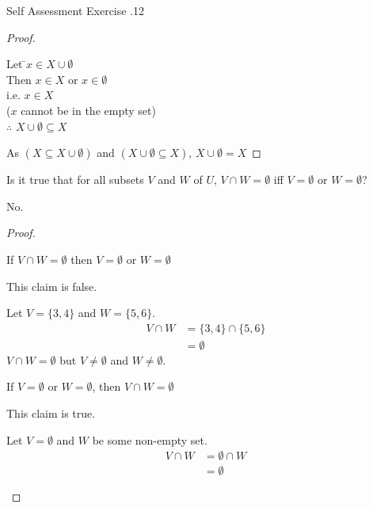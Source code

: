 \documentclass[\main/notes.tex]{subfiles}
\begin{document}
\begin{exercise}{Self Assessment Exercise \thechapter.12}
\begin{questions}
\begin{answer}
\begin{proof}
								\begin{tabbing}
									Let \quad \=$x \in X \cup \emptyset$\\
									Then \> $x \in X$ or $x \in \emptyset$\\
									i.e. \> $x \in X$\\
									\> ($x$ cannot be in the empty set)\\
									$\therefore$ \> $X \cup \emptyset \subseteq X$
								\end{tabbing}
								As $(X \subseteq X \cup \emptyset)$ and $(X \cup \emptyset \subseteq X)$, $X \cup \emptyset = X$
							\end{proof}
						\end{answer}
					\item Is it true that for all subsets $V$ and $W$ of $U$, $V \cap W = \emptyset$ iff $V = \emptyset$ or $W = \emptyset$?\\
						\begin{answer}
							No.
							\begin{proof}
								$ $
								\begin{questions}[label=(\roman*), first=\bfseries]
									\item If $V \cap W = \emptyset$ then $V = \emptyset$ or $W = \emptyset$\\
										\begin{answer}
											This claim is false.
											\begin{subproof}[Counterexample]
												Let $V = \{3, 4\}$ and $W = \{5, 6\}$.
												\begin{align*}
													V \cap W &= \{3, 4\} \cap \{5, 6\}\\
													&= \emptyset
												\end{align*}
												$V \cap W = \emptyset$ but $V \neq \emptyset$ and $W \neq \emptyset$.
											\end{subproof}
										\end{answer}
									\item If $V = \emptyset$ or $W = \emptyset$, then $V \cap W = \emptyset$\\
										\begin{answer}
											This claim is true.
											\begin{subproof}[Subproof]
												Let $V = \emptyset$ and $W$ be some non-empty set.
												\begin{align*}
													V \cap W &= \emptyset \cap W\\
													&= \emptyset

\end{align*}
\end{subproof}
\end{answer}
\end{questions}
\end{proof}
\end{answer}
\end{questions}
\end{exercise}
\end{document}
